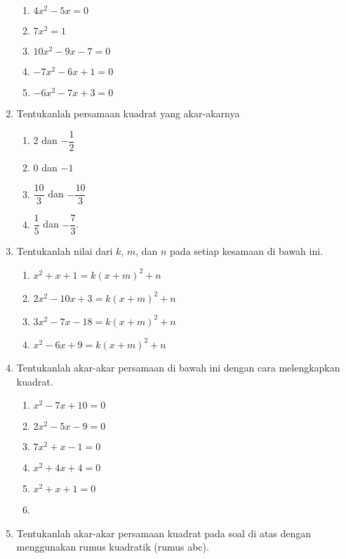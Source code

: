 \begin{enumerate}[nosep]
\begin{multcols}
\begin{enumerate}
					\item $ 4x^{2} - 5x = 0 $
					\item $ 7x^{2} = 1 $
					\item $ 10x^{2} - 9x - 7 = 0 $
					\item $ -7x^{2} - 6x + 1 = 0 $
					\item $ -6x^{2} - 7x + 3 = 0 $
				\end{enumerate}
			\end{multcols}
			\item Tentukanlah persamaan kuadrat yang akar-akarnya
			\begin{multcols}
				\begin{enumerate}
					\item 2 dan $ -\dfrac{1}{2} $
					\item 0 dan $ -1 $
					\item $ \dfrac{10}{3} $ dan $ -\dfrac{10}{3} $
					\item $ \dfrac{1}{5} $ dan $ -\dfrac{7}{3} $.
				\end{enumerate}
			\end{multcols}
			\item Tentukanlah nilai dari $ k $, $ m $, dan $ n $ pada setiap kesamaan di bawah ini.
			\begin{enumerate}
				\item $ x^{2} + x + 1 = k\left(x + m\right)^{2} + n $
				\item $ 2x^{2} - 10x + 3 = k\left(x + m\right)^{2} + n $
				\item $ 3x^{2} - 7x - 18 = k\left(x + m\right)^{2} + n $
				\item $ x^{2} - 6x + 9 = k\left(x + m\right)^{2} + n $
			\end{enumerate}
			\item Tentukanlah akar-akar persamaan di bawah ini dengan cara melengkapkan kuadrat.
			\begin{multcols}
				\begin{enumerate}
					\item $ x^{2} - 7x + 10 = 0 $
					\item $ 2x^{2} - 5x - 9 = 0 $
					\item $ 7x^{2} + x - 1 = 0 $
					\item $ x^{2} + 4x + 4 = 0 $
					\item $ x^{2} + x + 1 = 0 $
					\item[]
				\end{enumerate}
			\end{multcols}
			\item Tentukanlah akar-akar persamaan kuadrat pada soal di atas dengan menggunakan rumus kuadratik (rumus abc).

\end{enumerate}
